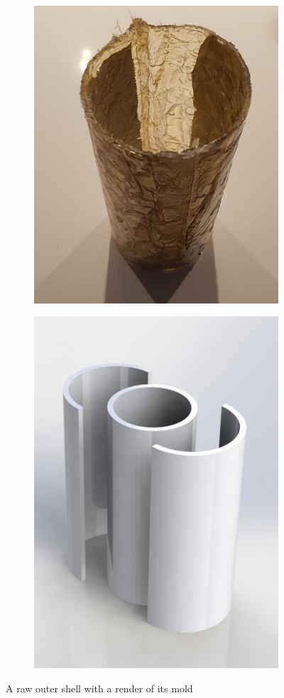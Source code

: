 \documentclass[]{report}
\begin{document}
		\begin{figure}
			\centering
			\begin{subfigure}{.5\textwidth}
				\centering
				\includegraphics[width=.8\linewidth]{rawshell.jpg}
			\end{subfigure}%
			\begin{subfigure}{.5\textwidth}
				\centering
				\includegraphics[width=0.7\linewidth, angle=0]{Mold_render.jpg}
			\end{subfigure}
			\caption{A raw outer shell with a render of its mold}
			\label{shellmold}
		\end{figure}
		
\end{document}
